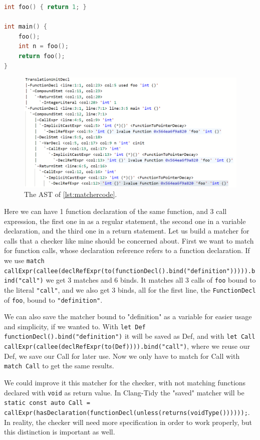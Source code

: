 \begin{lstlisting}[language={C++},caption={A very simple code for matching function calls.},label={lst:matchercode}]
int foo() { return 1; }

int main() {
	foo();
	int n = foo();
	return foo();
}
\end{lstlisting}

\begin{figure}[H]
    \includegraphics[width=\linewidth]{images/ast_for_matching.png}
	\caption{The AST of \cref{lst:matchercode}.}
    \label{fig:ast3}
\end{figure}

Here we can have 1 function declaration of the same function, and 3 call expression, the first one in as a regular statement, the second one in
a variable declaration, and the third one in a return statement. Let us build a matcher for calls that a checker like mine should be
concerned about.
First we want to match for function calls, whose declaration reference refers to a function declaration. If we use
\lstinline{match callExpr(callee(declRefExpr(to(functionDecl().bind("definition"))))).bind("call")} we get 3 matches
and 6 binds. It matches all 3 calls of \texttt{foo} bound to the literal \texttt{"call"}, and we also get 3 binds, all for the
first line, the \texttt{FunctionDecl} of \texttt{foo}, bound to \texttt{"definition"}.

We can also save the matcher bound to "definition" as a variable for easier usage and simplicity, if we wanted to.
With \lstinline{let Def functionDecl().bind("definition")} it will be saved as Def, and with
\lstinline{let Call callExpr(callee(declRefExpr(to(Def)))).bind("call")}, where we reuse our Def, we save our Call for later use. Now we only have
to match for Call with \lstinline{match Call} to get the same results.

We could improve it this matcher for the checker, with not matching functions declared with \lstinline{void} as return value.
In Clang-Tidy the "saved" matcher will be
\lstinline{static const auto Call = callExpr(hasDeclaration(functionDecl(unless(returns(voidType())))));}. In reality, the
checker will need more specification in order to work properly, but this distinction is important as well.

